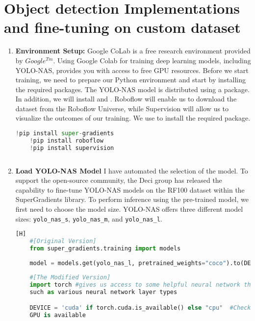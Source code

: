 \section{Object detection Implementations and fine-tuning on custom dataset}

\begin{enumerate}
    \item \textbf{Environment Setup: } Google CoLab is a free research environment provided by $Google^{Tm}$. Using Google Colab for training deep learning models, including YOLO-NAS, provides you with access to free GPU resources. Before we start training, we need to prepare our Python environment and start by installing the required packages.
    The YOLO-NAS model is distributed using a \boxed{\textcolor{black}{super-gradients}}  package. In addition, we will install  and . Roboflow will enable us to download the dataset from the Roboflow Universe, while Supervision will allow us to visualize the outcomes of our training. We use  to install the required package. \cite{supergradients}
    
    \begin{lstlisting}[language=Python, caption=Installing the required package]
    !pip install super-gradients
    !pip install roboflow
    !pip install supervision
        
    \end{lstlisting}
    \item \textbf{Load YOLO-NAS Model}
    I have automated the selection of the model. To support the open-source community, the Deci group has released the capability to fine-tune YOLO-NAS models on the RF100 dataset within the SuperGradients library. To perform inference using the pre-trained model, we first need to choose the model size. YOLO-NAS offers three different model sizes:  \verb|yolo_nas_s|, \verb|yolo_nas_m|, and \verb|yolo_nas_l|.
    \begin{lstlisting}[language=Python, caption=importing models from the supergradients][H]
    #[Original Version]
    from super_gradients.training import models
    
    model = models.get(yolo_nas_l, pretrained_weights="coco").to(DEVICE)
    
    #[The Modified Version]
    import torch #gives us access to some helpful neural network things,
    such as various neural network layer types

    DEVICE = 'cuda' if torch.cuda.is_available() else "cpu"  #Check if
    GPU is available
    

\end{lstlisting}
\end{enumerate}
